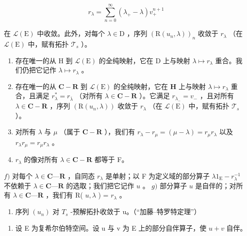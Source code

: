 \[
r _ {\lambda} = \sum_ {n = 0} ^ {\infty} (\lambda_ {+} - \lambda) v _ {+} ^ {n + 1}
\]

在 \(\mathcal{L}(\mathrm{E})\) 中收敛。此外，对每个 \(\lambda \in \mathrm{D}\) ，序列 \((\mathrm{R}(u_n,\lambda))_n\) 收敛于 \(r_{\lambda}\) （在 \(\mathcal{L}(\mathrm{E})\) 中，赋有拓扑 \(\mathcal{T}_s\) ）。

\begin{enumerate}
\def\labelenumi{\alph{enumi})}
\setcounter{enumi}{1}
\item
  存在唯一的从 H 到 \(\mathcal{L}(\mathrm{E})\) 的全纯映射，它在 D 上与映射 \(\lambda\mapsto r_{\lambda}\) 重合。我们仍把它记作 \(\lambda\mapsto r_{\lambda}\) 。
\item
  存在唯一的从 \(\mathbf{C} - \mathbf{R}\) 到 \(\mathcal{L}(\mathrm{E})\) 的全纯映射，它在 \(\mathbf{H}\) 上与映射 \(\lambda \mapsto r_{\lambda}\) 重合，且满足 \(r_{\lambda}^{*} = r_{\overline{\lambda}}\) （对所有 \(\lambda \in \mathbf{C} - \mathbf{R}\) ）。它满足 \(r_{\lambda_{-}} = v_{-}\) ，且对所有 \(\lambda \in \mathbf{C} - \mathbf{R}\) ，序列 \((\mathrm{R}(u_n,\lambda))\) 收敛于 \(r_{\lambda}\) （在 \(\mathcal{L}(\mathrm{E})\) 中，赋有拓扑 \(\mathcal{T}_s\) ）。
\item
  对所有 \(\lambda\) 与 \(\mu\) （属于 \(\mathbf{C} - \mathbf{R}\) ），我们有 \(r_{\lambda} - r_{\mu} = (\mu - \lambda) = r_{\mu}r_{\lambda}\) 以及 \(r_{\lambda}r_{\mu} = r_{\mu}r_{\lambda}\) 。\\
\item
  \(r_{\lambda}\) 的像对所有 \(\lambda \in \mathbf{C} - \mathbf{R}\) 都等于 F。
\end{enumerate}

\(f)\) 对每个 \(\lambda\in\mathbf{C}\text{—}\mathbf{R}\) ，自同态 \(r_{\lambda}\) 是单射；以 F 为定义域的部分算子 \(\lambda1_{\mathrm{E}}-r_{\lambda}^{-1}\) 不依赖于 \(\lambda\in\mathbf{C}\text{—}\mathbf{R}\) 的选取；我们把它记作 \(u\) 。 \(g)\) 部分算子 \(u\) 是自伴的；对所有 \(\lambda\in\mathbf{C}\text{—}\mathbf{R}\) ，我们有 R( \(u,\lambda\) ) = \(r_{\lambda}\) 。

\begin{enumerate}
\def\labelenumi{\alph{enumi})}
\setcounter{enumi}{7}
\tightlist
\item
  序列 \((u_{n})\) 对 \(T_{s}\) -预解拓扑收敛于 u。（“加藤–特罗特定理”）
\end{enumerate}

\begin{enumerate}
\def\labelenumi{\arabic{enumi})}
\setcounter{enumi}{31}
\tightlist
\item
  设 E 为复希尔伯特空间。设 u 与 v 为 E 上的部分自伴算子，使 \(u + v\) 自伴。
\end{enumerate}

